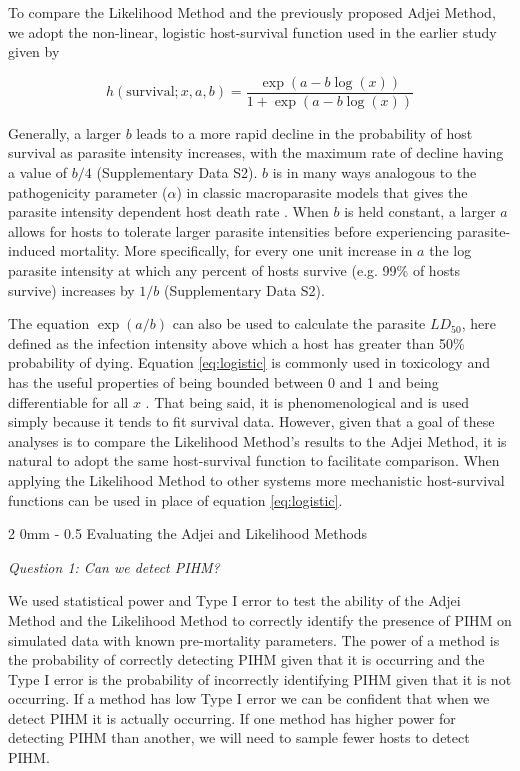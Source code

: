 \documentclass[12pt, a4paper]{article}
\makeatletter
\renewcommand{\subsection}{\@startsection
{subsection}%
{2}%
{0mm}%
{-\baselineskip}%
{0.5\baselineskip}%
{\normalfont\bf}} %
\makeatother
\begin{document}
To compare the Likelihood Method and the previously proposed Adjei Method, we adopt the non-linear, logistic host-survival function used in the earlier study given by

\begin{equation}
    h(\text{survival}; x, a, b) = \dfrac{\exp{(a - b \log(x))}}{1 + \exp{(a - b \log(x))}}
    \label{eq:logistic}
\end{equation}

Generally, a larger $b$ leads to a more rapid decline in the probability of host survival as parasite intensity increases, with the maximum rate of decline having a value of $b / 4$ (Supplementary Data S2). $b$ is in many ways analogous to the pathogenicity parameter ($\alpha$) in classic macroparasite models that gives the parasite intensity dependent host death rate \citep{AndersonandMay1978,Isham1995}. When $b$ is held constant, a larger $a$ allows for hosts to tolerate larger parasite intensities before experiencing parasite-induced mortality. More specifically, for every one unit increase in $a$ the log parasite intensity at which any percent of hosts survive (e.g. 99\% of hosts survive) increases by $1 / b$ (Supplementary Data S2).

The equation $\exp(a
/ b)$ can also be used to calculate the parasite $LD_{50}$, here defined as the
infection intensity above which a host has greater than 50\% probability of dying.  Equation \ref{eq:logistic} is commonly used in toxicology and has the useful properties of being bounded between 0 and 1 and being differentiable for all $x$ \citep{Collet2002}.  That being said, it is phenomenological and is used simply because it tends to fit survival data. However, given that a goal of these analyses is to
compare the Likelihood Method's results to the Adjei Method, it is natural
to adopt the same host-survival function to facilitate comparison.  When
applying the Likelihood Method to other systems more mechanistic host-survival functions can be used in place of equation \ref{eq:logistic}.

\subsection{Evaluating the Adjei and Likelihood Methods}

\emph{Question 1: Can we detect PIHM?}

We used statistical power and Type I error to test the ability of the Adjei Method and the Likelihood Method to correctly identify the presence of PIHM on simulated data with known pre-mortality parameters. The power of a method is the probability of correctly detecting PIHM given that it is occurring and the Type I error is the probability of incorrectly identifying PIHM given that it is not occurring. If a method has low Type I error we can be confident that when we detect PIHM it is actually occurring.  If one method has higher power for detecting PIHM than another, we will need to sample fewer hosts to detect PIHM.
\end{document}
